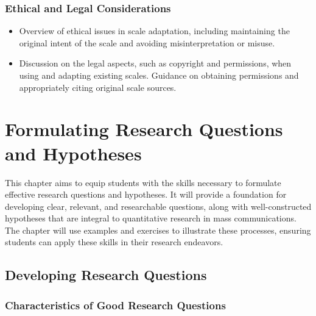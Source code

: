 \documentclass[
]{book}
\begin{document}
\hypertarget{ethical-and-legal-considerations}{%
\subsection*{Ethical and Legal Considerations}\label{ethical-and-legal-considerations}}

\begin{itemize}
\item
  Overview of ethical issues in scale adaptation, including maintaining the original intent of the scale and avoiding misinterpretation or misuse.
\item
  Discussion on the legal aspects, such as copyright and permissions, when using and adapting existing scales. Guidance on obtaining permissions and appropriately citing original scale sources.
\end{itemize}

\hypertarget{formulating-research-questions-and-hypotheses}{%
\chapter*{Formulating Research Questions and Hypotheses}\label{formulating-research-questions-and-hypotheses}}

This chapter aims to equip students with the skills necessary to formulate effective research questions and hypotheses. It will provide a foundation for developing clear, relevant, and researchable questions, along with well-constructed hypotheses that are integral to quantitative research in mass communications. The chapter will use examples and exercises to illustrate these processes, ensuring students can apply these skills in their research endeavors.

\hypertarget{developing-research-questions}{%
\section*{Developing Research Questions}\label{developing-research-questions}}

\hypertarget{characteristics-of-good-research-questions}{%
\subsection*{Characteristics of Good Research Questions}\label{characteristics-of-good-research-questions}}
\end{document}
